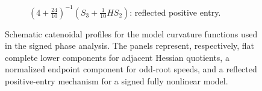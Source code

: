 \documentclass{amsart}
\theoremstyle{plain}
\theoremstyle{mainintrothm}
\theoremstyle{definition}
\begin{document}
\begin{figure}[htbp]
\begin{subfigure}[t]{0.32\textwidth}
		\caption{$\left(4+\frac{24}{10}\right)^{-1}\left(S_3+\frac{1}{10}HS_2\right)$: reflected positive entry.}
	\end{subfigure}
	
	\caption{\footnotesize Schematic catenoidal profiles for the model curvature functions used
		in the signed phase analysis.  The panels represent, respectively, flat
		complete lower components for adjacent Hessian quotients, a normalized
		endpoint component for odd-root speeds, and a reflected positive-entry
		mechanism for a signed fully nonlinear model.}
	\label{fig:model-catenoidal-profiles}
\end{figure}
\end{document}
